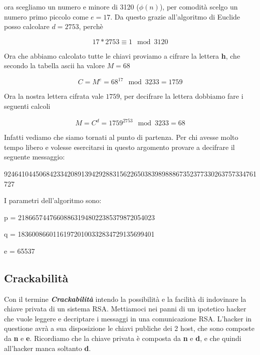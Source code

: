 \documentclass{rapport}
\begin{document}
ora scegliamo un numero e minore di 3120 ($\phi(n)$), per comodità scelgo un numero primo piccolo come $e=17$. Da questo grazie all'algoritmo di Euclide posso calcolare $d=2753$, perchè

\begin{equation*}
   17 * 2753 \equiv 1\mod 3120
\end{equation*}

Ora che abbiamo calcolato tutte le chiavi proviamo a cifrare la lettera \textbf{h}, che secondo la tabella ascii ha valore $M=68$


\begin{equation*}
   C = M^e = 68^{17} \mod 3233 = 1759
\end{equation*}

Ora la nostra lettera cifrata vale $1759$, per decifrare la lettera dobbiamo fare i seguenti calcoli



\begin{equation*}
   M = C^d = 1759^{2753} \mod 3233 = 68
\end{equation*}

Infatti vediamo che siamo tornati al punto di partenza. Per chi avesse molto tempo libero e volesse esercitarsi in questo argomento provare a decifrare il seguente messaggio:

\vspace{0.7cm}

924641044506842334208913942928831562265038398988867352377330263757334761727

\vspace{0.7cm}
I parametri dell'algoritmo sono:

p = 218665744766088631948022385379872054023

q = 183600866011619720100332834729135699401

e = 65537


\newpage
\subsection{Crackabilità}
Con il termine \textit{\textbf{Crackabilità}} intendo la possibilità e la facilità di indovinare la chiave privata di un sistema RSA. Mettiamoci nei panni di un ipotetico hacker che vuole leggere e decriptare i messaggi in una comunicazione RSA. L'hacker in questione avrà a sua disposizione le chiavi publiche dei 2 host, che sono composte da \textbf{n} e \textbf{e}. Ricordiamo che la chiave privata è composta da \textbf{n} e \textbf{d}, e che quindi all'hacker manca soltanto \textbf{d}.
\end{document}
